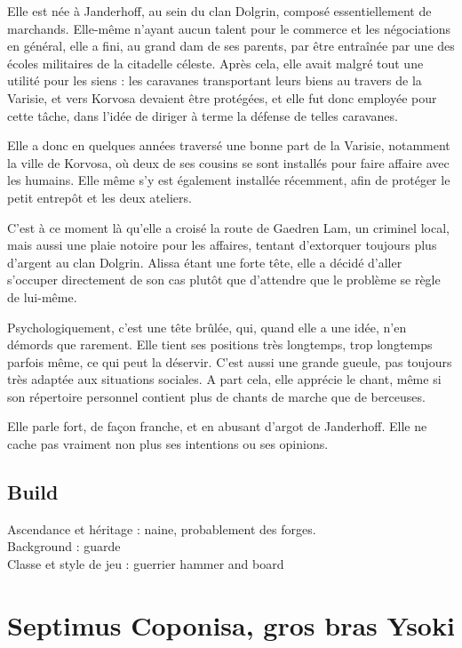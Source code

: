 \documentclass[10pt,a4paper]{book}
\begin{document}
Elle est née à Janderhoff, au sein du clan Dolgrin, composé essentiellement de marchands. Elle-même n'ayant aucun talent pour le commerce et les négociations en général, elle a fini, au grand dam de ses parents, par être entraînée par une des écoles militaires de la citadelle céleste. Après cela, elle avait malgré tout une utilité pour les siens : les caravanes transportant leurs biens au travers de la Varisie, et vers Korvosa devaient être protégées, et elle fut donc employée pour cette tâche, dans l'idée de diriger à terme la défense de telles caravanes.

Elle a donc en quelques années traversé une bonne part de la Varisie, notamment la ville de Korvosa, où deux de ses cousins se sont installés pour faire affaire avec les humains. Elle même s'y est également installée récemment, afin de protéger le petit entrepôt et les deux ateliers.

C'est à ce moment là qu'elle a croisé la route de Gaedren Lam, un criminel local, mais aussi une plaie notoire pour les affaires, tentant d'extorquer toujours plus d'argent au clan Dolgrin. Alissa étant une forte tête, elle a décidé d'aller s'occuper directement de son cas plutôt que d'attendre que le problème se règle de lui-même.

Psychologiquement, c'est une tête brûlée, qui, quand elle a une idée, n'en démords que rarement. Elle tient ses positions très longtemps, trop longtemps parfois même, ce qui peut la déservir. C'est aussi une grande gueule, pas toujours très adaptée aux situations sociales. A part cela, elle apprécie le chant, même si son répertoire personnel contient plus de chants de marche que de berceuses.

Elle parle fort, de façon franche, et en abusant d'argot de Janderhoff. Elle ne cache pas vraiment non plus ses intentions ou ses opinions.

\subsection{Build}
Ascendance et héritage : naine, probablement des forges.\\
Background : guarde\\
Classe et style de jeu : guerrier hammer and board\\

\section{Septimus Coponisa, gros bras Ysoki}
\end{document}

